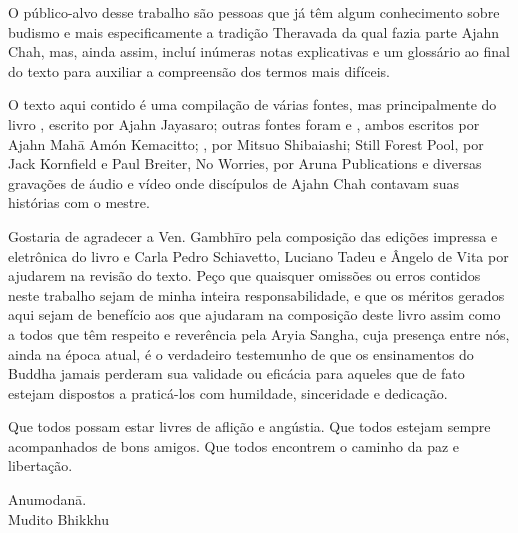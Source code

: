 O público-alvo desse trabalho são pessoas que já têm algum conhecimento
sobre budismo e mais especificamente a tradição Theravada da qual fazia
parte Ajahn Chah, mas, ainda assim, incluí inúmeras notas explicativas e
um glossário ao final do texto para auxiliar a compreensão dos termos
mais difíceis.

O texto aqui contido é uma compilação de várias fontes, mas
principalmente do livro , escrito por Ajahn Jayasaro; outras
fontes foram  e , ambos escritos por Ajahn
Mahā Amón Kemacitto; , por Mitsuo Shibaiashi;
Still Forest Pool, por Jack Kornfield e Paul Breiter, No Worries, por
Aruna Publications e diversas gravações de áudio e vídeo onde discípulos
de Ajahn Chah contavam suas histórias com o mestre.

Gostaria de agradecer a Ven. Gambhīro pela composição das edições
impressa e eletrônica do livro e Carla Pedro Schiavetto, Luciano Tadeu e
Ângelo de Vita por ajudarem na revisão do texto. Peço que quaisquer
omissões ou erros contidos neste trabalho sejam de minha inteira
responsabilidade, e que os méritos gerados aqui sejam de benefício aos
que ajudaram na composição deste livro assim como a todos que têm
respeito e reverência pela Aryia Sangha, cuja presença entre nós, ainda
na época atual, é o verdadeiro testemunho de que os ensinamentos do
Buddha jamais perderam sua validade ou eficácia para aqueles que de fato
estejam dispostos a praticá-los com humildade, sinceridade e dedicação.

Que todos possam estar livres de aflição e angústia. Que todos estejam
sempre acompanhados de bons amigos. Que todos encontrem o caminho da paz
e libertação.

\bigskip

{\raggedleft
Anumodanā.\\
Mudito Bhikkhu
\par}
